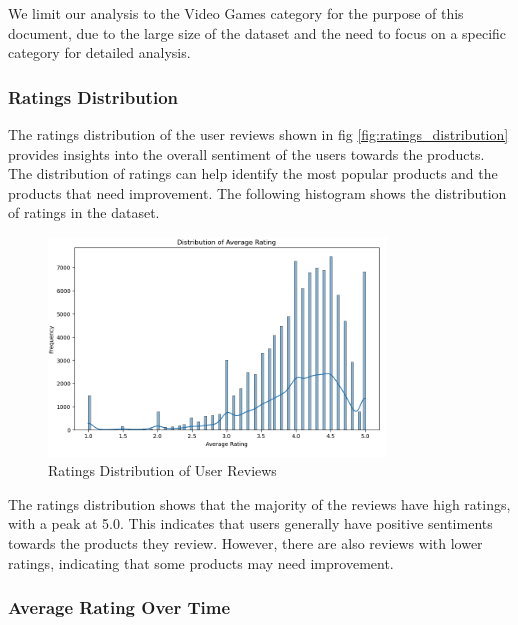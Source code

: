 \documentclass{article}
\begin{document}
We limit our analysis to the Video Games category for the purpose of this document, due to the large size of the dataset and the need to focus on a specific category for detailed analysis.

\subsubsection{Ratings Distribution}

The ratings distribution of the user reviews shown in fig \autoref{fig:ratings_distribution}  provides insights into the overall sentiment of the users towards the products. The distribution of ratings can help identify the most popular products and the products that need improvement. The following histogram shows the distribution of ratings in the dataset.

\begin{figure}[H]
\centering
\includegraphics[width=0.8\textwidth]{img/avg_rating.png}
\caption{Ratings Distribution of User Reviews}
\label{fig:ratings_distribution}
\end{figure}

The ratings distribution shows that the majority of the reviews have high ratings, with a peak at 5.0. This indicates that users generally have positive sentiments towards the products they review. However, there are also reviews with lower ratings, indicating that some products may need improvement.

\subsubsection{Average Rating Over Time}
\end{document}
